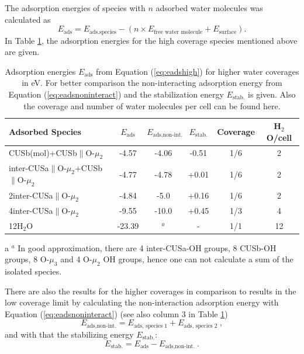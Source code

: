 \documentclass[11pt,DIV=13,BCOR=5mm,a4paper,headinclude]{scrbook}
\begin{document}
The adsorption energies of species with $n$ adsorbed water molecules was calculated as
\begin{equation}\label{eq:eadshigh}
 E_\textrm{ads}=E_\textrm{ads.species}-(n\times E_\text{free water molecule}+E_\text{surface}).
\end{equation}
In Table \ref{tab:higher_water}, the adsorption energies for the high coverage species mentioned above are given.
\begin{table}[!ht]
  \centering
 \caption{Adsorption energies $E_\textrm{ads}$ from Equation (\ref{eq:eadshigh}) for higher water coverages in eV.
For better comparison the non-interacting adsorption energy from Equation (\ref{eq:eadsnoninteract}) and the stabilization energy $E_\textrm{stab.}$ is given.
Also the coverage and number of water molecules per cell can be found here.
\vspace*{.2cm} 
  }
  \begin{tabular}{lccccc}
  \toprule
  Adsorbed Species  & $E_\textrm{ads}$ & $E_\textrm{ads,non-int.}$& $E_\textrm{stab.}$& Coverage &H$_2$O/cell\\\midrule
   CUSb(mol)+CUSb$\parallel$O-$\mu_2$ & -4.57 & -4.06&-0.51&1/6&2\\
   inter-CUSa$\parallel$O-$\mu_2$+CUSb$\parallel$O-$\mu_2$ & -4.77 & -4.78&+0.01&1/6&2\\
   2inter-CUSa$\parallel$O-$\mu_2$& -4.84 &-5.0&+0.16&1/6&2 \\\hline
   4inter-CUSa$\parallel$O-$\mu_2$ & -9.55 & -10.0&+0.45&1/3&4\\\hline
   12H$_2$O & -23.39& $^a$\tnote{a} &-&1/1& 12\\\bottomrule
  \end{tabular}
  \label{tab:higher_water}
  \begin{tablenotes}\footnotesize 
    \item[a] $^a$ In good approximation, there are 4 inter-CUSa-OH groups, 8 CUSb-OH groups, 8 O-$\mu_3$ and 4 O-$\mu_2$ OH groups, hence one can not calculate a sum of the isolated species.
  \end{tablenotes}
\end{table}
There are also the results for the higher coverages in comparison to results in the low coverage limit by calculating the non-interaction adsorption energy with Equation (\ref{eq:eadsnoninteract}) (see also column 3 in Table \ref{tab:higher_water})
\begin{equation}\label{eq:eadsnoninteract}
 E_\textrm{ads,non-int.}=E_\textrm{ads, species 1} + E_\textrm{ads, species 2}~,
\end{equation}
and with that the stabilizing energy $E_\textrm{stab.}$:
\begin{equation}\label{eq:stab}
 E_\textrm{stab.}=E_\textrm{ads}-E_\textrm{ads,non-int.}~.
\end{equation}
\end{document}
